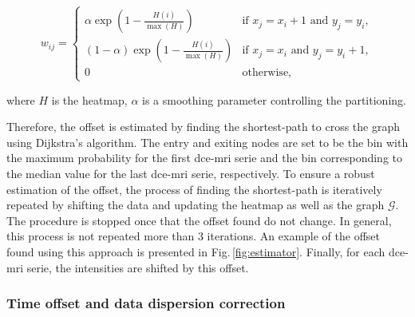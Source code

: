 \begin{equation}
  w_{ij} = \begin{cases}
    \alpha \exp(1 - \frac{H(i)}{\max(H)})       & \text{if } x_j = x_i + 1 \text{ and } y_j = y_i, \\
    (1 - \alpha) \exp(1 - \frac{H(i)}{\max(H)}) & \text{if } x_j = x_i \text{ and } y_j = y_i + 1, \\
    0                                           & \text{otherwise},
  \end{cases}
  \label{eq:weight}
\end{equation}

\noindent where $H$ is the heatmap, $\alpha$ is a smoothing parameter controlling the partitioning.

Therefore, the offset is estimated by finding the shortest-path to cross the graph using Dijkstra's algorithm.
The entry and exiting nodes are set to be the bin with the maximum probability for the first \ac{dce}-\ac{mri} serie and the bin corresponding to the median value for the last \ac{dce}-\ac{mri} serie, respectively.
To ensure a robust estimation of the offset, the process of finding the shortest-path is iteratively repeated by shifting the data and updating the heatmap as well as the graph $\mathcal{G}$.
The procedure is stopped once that the offset found do not change.
In general, this process is not repeated more than 3 iterations.
An example of the offset found using this approach is presented in Fig.\,\ref{fig:estimator}.
Finally, for each \ac{dce}-\ac{mri} serie, the intensities are shifted by this offset.

\subsubsection{Time offset and data dispersion correction}

